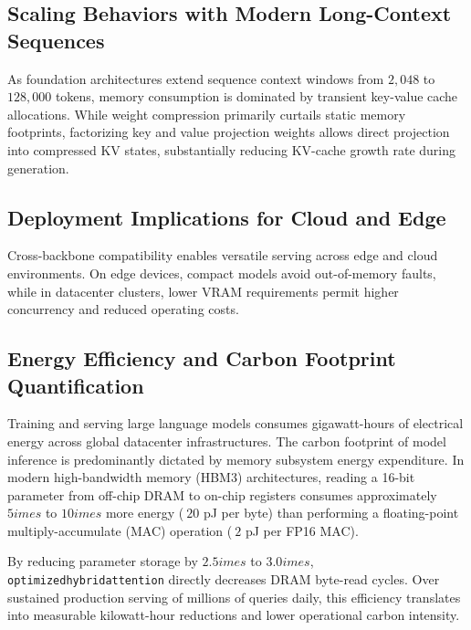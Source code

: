\subsection{Scaling Behaviors with Modern Long-Context Sequences}
As foundation architectures extend sequence context windows from $2{,}048$ to $128{,}000$ tokens, memory consumption is dominated by transient key-value cache allocations. While weight compression primarily curtails static memory footprints, factorizing key and value projection weights allows direct projection into compressed KV states, substantially reducing KV-cache growth rate during generation.

\subsection{Deployment Implications for Cloud and Edge}
Cross-backbone compatibility enables versatile serving across edge and cloud environments. On edge devices, compact models avoid out-of-memory faults, while in datacenter clusters, lower VRAM requirements permit higher concurrency and reduced operating costs.

\subsection{Energy Efficiency and Carbon Footprint Quantification}
Training and serving large language models consumes gigawatt-hours of electrical energy across global datacenter infrastructures. The carbon footprint of model inference is predominantly dictated by memory subsystem energy expenditure. In modern high-bandwidth memory (HBM3) architectures, reading a 16-bit parameter from off-chip DRAM to on-chip registers consumes approximately $5	imes$ to $10	imes$ more energy ($~20$ pJ per byte) than performing a floating-point multiply-accumulate (MAC) operation ($~2$ pJ per FP16 MAC).

By reducing parameter storage by $2.5	imes$ to $3.0	imes$, \texttt{optimizedhybridattention} directly decreases DRAM byte-read cycles. Over sustained production serving of millions of queries daily, this efficiency translates into measurable kilowatt-hour reductions and lower operational carbon intensity.
